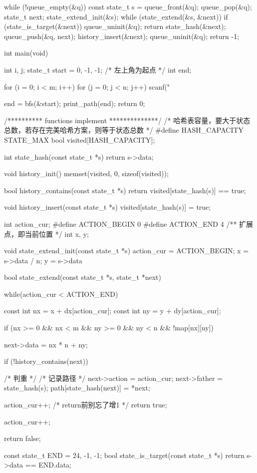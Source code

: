 \begin{Codex}[label=maze.c]
{    while (!queue_empty(&q)) {
        const state_t s = queue_front(&q);
        queue_pop(&q);
        state_t next;
        state_extend_init(&s);
        while (state_extend(&s, &next)) {
            if (state_is_target(&next)) {
                queue_uninit(&q);
                return state_hash(&next);
            }
            queue_push(&q, next);
            history_insert(&next);
        }
    }
    queue_uninit(&q);
    return -1;
}

int main(void) {
    int i, j;
    state_t start = {0, -1, -1}; /* 左上角为起点 */
    int end;

    for (i = 0; i < m; i++) {
        for (j = 0; j < n; j++) {
            scanf("%
        }
    }

    end = bfs(&start);
    print_path(end);
    return 0;
}

/********** functions implement **************/
/* 哈希表容量，要大于状态总数，若存在完美哈希方案，则等于状态总数 */
#define HASH_CAPACITY STATE_MAX
bool visited[HASH_CAPACITY];

int state_hash(const state_t *s) {
    return s->data;
}

void history_init() {
    memset(visited, 0, sizeof(visited));
}

bool history_contains(const state_t *s) {
    return visited[state_hash(s)] == true;
}

void history_insert(const state_t *s) {
    visited[state_hash(s)] = true;
}

int action_cur;
#define ACTION_BEGIN 0
#define ACTION_END 4
/** 扩展点，即当前位置 */
int x, y;

void state_extend_init(const state_t *s) {
    action_cur = ACTION_BEGIN;
    x = s->data / n;
    y = s->data %
}

bool state_extend(const state_t *s, state_t *next) {
    while(action_cur < ACTION_END) {
        const int nx = x + dx[action_cur];
        const int ny = y + dy[action_cur];

        if (nx >= 0 && nx < m && ny >= 0 && ny < n && !map[nx][ny]) {
            next->data = nx * n + ny;

            if (!history_contains(next)) { /* 判重 */
                /* 记录路径 */
                next->action = action_cur;
                next->father = state_hash(s);
                path[state_hash(next)] = *next;

                action_cur++;  /* return前别忘了增1 */
                return true;
            }
        }
        action_cur++;
    }
    return false;
}

const state_t END = {24, -1, -1};
bool state_is_target(const state_t *s) {
    return s->data == END.data;
}
\end{Codex}

